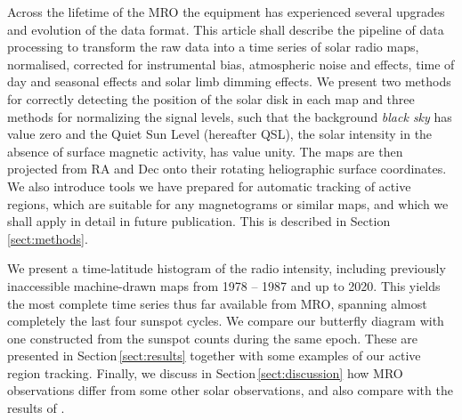 \documentclass{aa}
\begin{document}
  Across the lifetime of the MRO the equipment has experienced several upgrades
  and evolution of the data format.
  This article shall describe the pipeline of data processing to transform the
  raw data into a time series of solar radio maps, normalised, corrected for
  instrumental bias, atmospheric noise and effects, time of day and seasonal
  effects and solar limb dimming effects.
  We present two methods for correctly detecting the position of the solar disk
  in each map and three methods for normalizing the signal levels, such that
  the background \emph{black sky} has value zero and the 
  Quiet Sun Level (hereafter QSL),
  the solar intensity in the absence of surface magnetic activity, has
  value unity.
  The maps are then projected from RA and Dec onto their rotating heliographic
  surface coordinates.
  We also introduce tools we have prepared for automatic tracking of active 
  regions, which are suitable for any magnetograms or similar maps, and which
  we shall apply in detail in future publication.
  This is described in Section\,\ref{sect:methods}.

  We present a time-latitude histogram of the radio intensity,
  including previously inaccessible machine-drawn maps from 1978 -- 1987 and
  up to 2020.
  This yields the most complete time series thus far available from MRO, 
  spanning almost completely the last four sunspot cycles.
  We compare our butterfly diagram with one constructed from the sunspot 
  counts during the same epoch.
  These are presented in Section\,\ref{sect:results} together with some 
  examples of our active region tracking.
  Finally, we discuss in Section\,\ref{sect:discussion} 
  how MRO observations differ from some other solar observations, 
  and also compare with the results of \citet{Shibasaki13}. 
\end{document}
